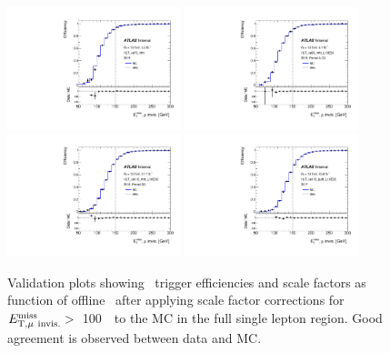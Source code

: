 \begin{figure}[tb!]
    \centering
    \includegraphics[width=0.45\textwidth]{chapters/c6/figures/METTriggerCalibration/validation_HLT_xe70_mht.pdf}
    \includegraphics[width=0.45\textwidth]{chapters/c6/figures/METTriggerCalibration/validation_HLT_xe90_mht_L1XE50.pdf}
    \includegraphics[width=0.45\textwidth]{chapters/c6/figures/METTriggerCalibration/validation_HLT_xe110_mht_L1XE50.pdf}
    \includegraphics[width=0.45\textwidth]{chapters/c6/figures/METTriggerCalibration/validation_HLT_xe110_pufit_L1XE55.pdf}
    \caption{Validation plots showing \MET~trigger efficiencies and scale factors as function of offline \METnomu~after applying scale factor corrections for $E_{\mathrm{T, \mu~invis.}}^{\mathrm{miss}} >$~100~\GeV~to the MC in the full single lepton region. Good agreement is observed between data and MC.}
    \label{fig:TrigSF_validation}
\end{figure}

